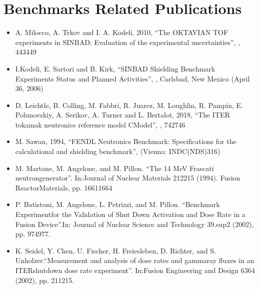 \documentclass[letterpaper,10pt,english]{sphinxmanual}
\begin{document}
\section{Benchmarks Related Publications}
\label{\detokenize{publications:benchmarks-related-publications}}\begin{itemize}
\item {} 
\sphinxAtStartPar
A. Milocco, A. Trkov and I. A. Kodeli, 2010, “The OKTAVIAN TOF experiments in SINBAD: Evaluation of the
experimental uncertainties”, ,  443\sphinxhyphen{}449

\item {} 
\sphinxAtStartPar
I.Kodeli, E. Sartori and B. Kirk, “SINBAD \sphinxhyphen{} Shielding Benchmark Experiments \sphinxhyphen{} Status and Planned Activities”,
,
Carlsbad, New Mexico (April 3\sphinxhyphen{}6, 2006)

\item {} 
\sphinxAtStartPar
D. Leichtle, B. Colling, M. Fabbri, R. Juarez, M. Loughlin,
R. Pampin, E. Polunovskiy, A. Serikov, A. Turner and L. Bertalot, 2018,
“The ITER tokamak neutronics reference model C\sphinxhyphen{}Model”,
,  742\sphinxhyphen{}746

\item {} 
\sphinxAtStartPar
M. Sawan, 1994,  “FENDL Neutronics Benchmark: Specifications for the calculational and shielding benchmark”,
(Vienna: INDC(NDS)\sphinxhyphen{}316)

\item {} 
\sphinxAtStartPar
M. Martone, M. Angelone, and M. Pillon. “The 14 MeV Frascati neutrongenerator”.
In:Journal of Nuclear Materials 212\sphinxhyphen{}215 (1994). Fusion ReactorMaterials, pp. 1661\textendash{}1664

\item {} 
\sphinxAtStartPar
P. Batistoni, M. Angelone, L. Petrizzi, and M. Pillon. “Benchmark Experimentfor the
Validation of Shut Down Activation and Dose Rate in a Fusion Device”.In: Journal of Nuclear
Science and Technology 39.sup2 (2002), pp. 974\textendash{}977.

\item {} 
\sphinxAtStartPar
K. Seidel, Y. Chen, U. Fischer, H. Freiesleben, D. Richter, and S. Unholzer.“Measurement
and analysis of dose rates and gamma\sphinxhyphen{}ray fluxes in an ITERshut\sphinxhyphen{}down dose rate experiment”.
In:Fusion Engineering and Design 63\sphinxhyphen{}64 (2002), pp. 211\textendash{}215.


\end{itemize}
\end{document}
